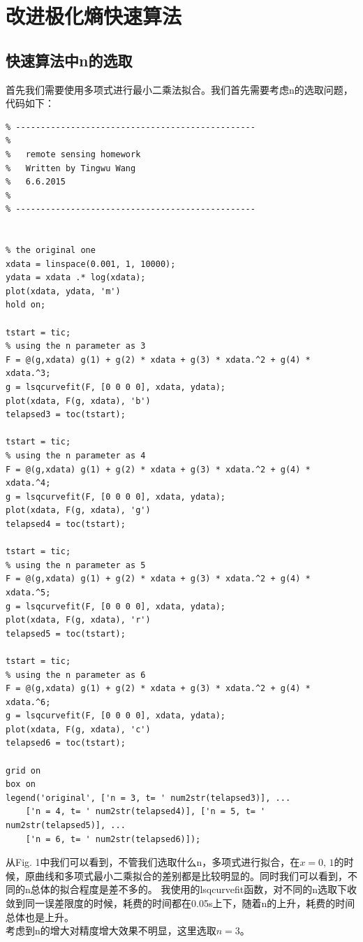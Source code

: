 \documentclass{article}
\begin{document}
\section{改进极化熵快速算法}
\subsection{快速算法中n的选取}
首先我们需要使用多项式进行最小二乘法拟合。我们首先需要考虑n的选取问题，代码如下：
\begin{lstlisting}
% ------------------------------------------------
%
%   remote sensing homework
%   Written by Tingwu Wang
%   6.6.2015
% 
% ------------------------------------------------


% the original one
xdata = linspace(0.001, 1, 10000);
ydata = xdata .* log(xdata);
plot(xdata, ydata, 'm')
hold on;

tstart = tic;
% using the n parameter as 3
F = @(g,xdata) g(1) + g(2) * xdata + g(3) * xdata.^2 + g(4) * xdata.^3;
g = lsqcurvefit(F, [0 0 0 0], xdata, ydata);
plot(xdata, F(g, xdata), 'b')
telapsed3 = toc(tstart);

tstart = tic;
% using the n parameter as 4
F = @(g,xdata) g(1) + g(2) * xdata + g(3) * xdata.^2 + g(4) * xdata.^4;
g = lsqcurvefit(F, [0 0 0 0], xdata, ydata);
plot(xdata, F(g, xdata), 'g')
telapsed4 = toc(tstart);

tstart = tic;
% using the n parameter as 5
F = @(g,xdata) g(1) + g(2) * xdata + g(3) * xdata.^2 + g(4) * xdata.^5;
g = lsqcurvefit(F, [0 0 0 0], xdata, ydata);
plot(xdata, F(g, xdata), 'r')
telapsed5 = toc(tstart);

tstart = tic;
% using the n parameter as 6
F = @(g,xdata) g(1) + g(2) * xdata + g(3) * xdata.^2 + g(4) * xdata.^6;
g = lsqcurvefit(F, [0 0 0 0], xdata, ydata);
plot(xdata, F(g, xdata), 'c')
telapsed6 = toc(tstart);

grid on
box on
legend('original', ['n = 3, t= ' num2str(telapsed3)], ...
    ['n = 4, t= ' num2str(telapsed4)], ['n = 5, t= ' num2str(telapsed5)], ...
    ['n = 6, t= ' num2str(telapsed6)]);
\end{lstlisting}
从Fig. 1中我们可以看到，不管我们选取什么n，多项式进行拟合，在\(x = 0,\,1\)的时候，原曲线和多项式最小二乘拟合的差别都是比较明显的。同时我们可以看到，不同的n总体的拟合程度是差不多的。
我使用的lsqcurvefit函数，对不同的n选取下收敛到同一误差限度的时候，耗费的时间都在0.05s上下，随着n的上升，耗费的时间总体也是上升。\\
考虑到n的增大对精度增大效果不明显，这里选取\(n=3\)。
\end{document}
